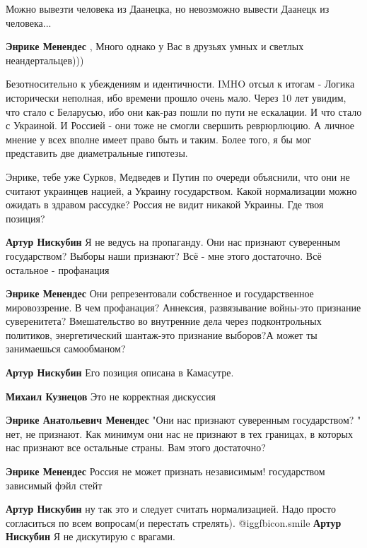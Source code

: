 \begin{itemize}
Можно вывезти человека из Даанецка, но невозможно вывести Даанецк из человека...

\textbf{Энрике Менендес} , Много однако у Вас в друзьях умных и светлых неандертальцев)))

Безотносительно к убеждениям и идентичности.
IMHO отсыл к итогам - Логика исторически неполная, ибо времени прошло очень мало. Через 10 лет увидим, что стало с Беларусью, ибо они как-раз пошли по пути не ескалации.
И что стало с Украиной. И Россией - они тоже не смогли свершить реврюрлюцию.
А личное мнение у всех вполне имеет право быть и таким.
Более того, я бы мог представить две диаметральные гипотезы.


Энрике, тебе уже Сурков, Медведев и Путин по очереди объяснили, что они не
считают украинцев нацией, а Украину государством. Какой нормализации можно
ожидать в здравом рассудке? Россия не видит никакой Украины. Где твоя позиция?

\begin{itemize} %
\textbf{Артур Нискубин} Я не ведусь на пропаганду. Они нас признают суверенным государством? Выборы наши признают? Всё - мне этого достаточно.
Всё остальное - профанация

\textbf{Энрике Менендес} Они репрезентовали собственное и государственное мировоззрение. В чем профанация? Аннексия, развязывание войны-это признание суверенитета? Вмешательство во внутренние дела через подконтрольных политиков, энергетический шантаж-это признание выборов?А может ты занимаешься самообманом?

\textbf{Артур Нискубин} Его позиция описана в Камасутре.

\textbf{Михаил Кузнецов} Это не корректная дискуссия

\textbf{Энрике Анатольевич Менендес} "Они нас признают суверенным государством? "
нет, не признают. Как минимум они нас не признают в тех границах, в которых нас признают все остальные страны. Вам этого достаточно?

\textbf{Энрике Менендес} Россия не может признать независимым! государством зависимый фэйл стейт

\textbf{Артур Нискубин} ну так это и следует считать нормализацией. Надо просто согласиться по всем вопросам(и перестать стрелять).  @igg{fbicon.smile} 
\textbf{Артур Нискубин} Я не дискутирую с врагами.


\end{itemize}
\end{itemize}
